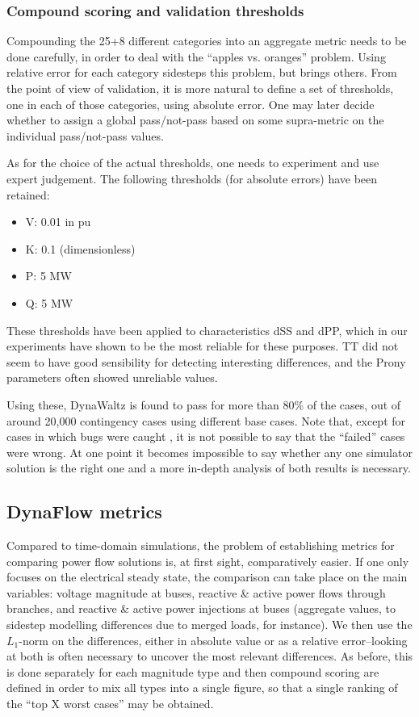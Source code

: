 \documentclass[conference]{IEEEtran}
\begin{document}
\subsubsection{Compound scoring and validation thresholds}

Compounding the 25+8 different categories into an aggregate metric needs to be
done carefully, in order to deal with the ``apples vs. oranges'' problem. Using
relative error for each category sidesteps this problem, but brings others.
From the point of view of validation, it is more natural to define a set of
thresholds, one in each of those categories, using absolute error. One may later
decide whether to assign a global pass/not-pass based on some supra-metric on
the individual pass/not-pass values.

As for the choice of the actual thresholds, one needs to experiment and use
expert judgement. The following thresholds (for absolute errors) have been retained:
\begin{itemize}
  \item V: 0.01 in pu
  \item K: 0.1 (dimensionless)
  \item P: 5 MW
  \item Q: 5 MW
\end{itemize}
These thresholds have been applied to characteristics dSS and dPP, which in our
experiments have shown to be the most reliable for these purposes. TT did not
seem to have good sensibility for detecting interesting differences, and the
Prony parameters often showed unreliable values.

Using these, DynaWaltz is found to pass for more than 80\% of the cases, out of
around 20,000 contingency cases using different base cases.  Note that, except
for cases in which bugs were caught , it is not possible to say that the ``failed'' cases
were wrong.  At one point it becomes impossible to say whether any one simulator
solution is the right one and a more in-depth analysis of both results is necessary.



\subsection{DynaFlow metrics}

Compared to time-domain simulations, the problem of establishing metrics for
comparing power flow solutions is, at first sight, comparatively easier. If one
only focuses on the electrical steady state, the comparison can take place on
the main variables: voltage magnitude at buses, reactive \& active power flows
through branches, and reactive \& active power injections at buses (aggregate
values, to sidestep modelling differences due to merged loads, for instance). We
then use the $L_1$-norm on the differences, either in absolute value or as a
relative error--looking at both is often necessary to uncover the most relevant
differences. As before, this is done separately for each magnitude type and then compound scoring are defined in order to mix all types into a single figure, so
that a single ranking of the ``top X worst cases'' may be obtained.
\end{document}
